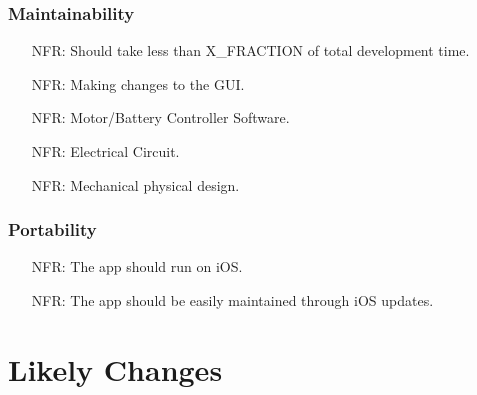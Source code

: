 \documentclass[12pt]{article}
\newcounter{nfrnum} %
\begin{document}
\subsubsection{Maintainability}
\begin{itemize}
\setlength{\itemindent}{.5in}
\item[NFR\refstepcounter{nfrnum}\thenfrnum\label{NFR17}:] Should take less than X\_FRACTION of total development time.
\item[NFR\refstepcounter{nfrnum}\thenfrnum\label{NFR18}:] Making changes to the GUI.
\item[NFR\refstepcounter{nfrnum}\thenfrnum\label{NFR19}:] Motor/Battery Controller Software.
\item[NFR\refstepcounter{nfrnum}\thenfrnum\label{NFR20}:] Electrical Circuit.
\item[NFR\refstepcounter{nfrnum}\thenfrnum\label{NFR21}:] Mechanical physical design.
\end{itemize}

\subsubsection{Portability}
\begin{itemize}
\setlength{\itemindent}{.5in}
\item[NFR\refstepcounter{nfrnum}\thenfrnum\label{NFR22}:] The app should run on iOS.
\item[NFR\refstepcounter{nfrnum}\thenfrnum\label{NFR23}:] The app should be easily maintained through iOS updates.
\end{itemize}




\section{Likely Changes}    
\end{document}
